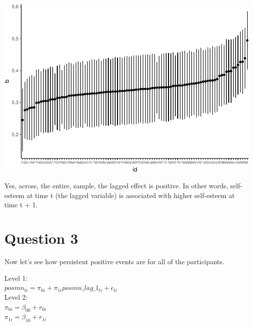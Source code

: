 \documentclass[]{article}
\newenvironment{Shaded}{\begin{snugshade}}{\end{snugshade}}
\newcommand{\KeywordTok}[1]{\textcolor[rgb]{0.13,0.29,0.53}{\textbf{#1}}}
\newcommand{\DataTypeTok}[1]{\textcolor[rgb]{0.13,0.29,0.53}{#1}}
\newcommand{\FloatTok}[1]{\textcolor[rgb]{0.00,0.00,0.81}{#1}}
\newcommand{\StringTok}[1]{\textcolor[rgb]{0.31,0.60,0.02}{#1}}
\newcommand{\OperatorTok}[1]{\textcolor[rgb]{0.81,0.36,0.00}{\textbf{#1}}}
\newcommand{\NormalTok}[1]{#1}
\begin{document}
\includegraphics{Beck_HW_7_R_2_files/figure-latex/unnamed-chunk-4-1.pdf}

\begin{Shaded}
\end{Shaded}

Yes, across, the entire, sample, the lagged effect is positive. In other
words, self-esteem at time t (the lagged variable) is associated with
higher self-esteem at time t + 1.

\section{Question 3}\label{question-3}

Now let's see how persistent positive events are for all of the
participants.

Level 1:\\
\(posmn_{ti} = \pi_{0i} + \pi_{1i}posmn\_lag\_1_{ti} + \epsilon_{ti}\)\\
Level 2:\\
\(\pi_{0i} = \beta_{00} + r_{0i}\)\\
\(\pi_{1i} = \beta_{10} + r_{1i}\)
\end{document}
